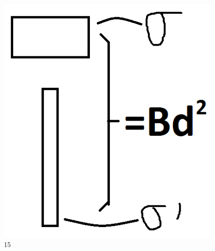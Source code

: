 \documentclass[a4paper, 12pt]{article}
\begin{document}
\begin{figure}[h]
\begin{center}
\includegraphics[scale=0.35]{./fig/11.png}
\caption{\label{fig:15}15} 
\end{center}
\end{figure}
\end{document}
